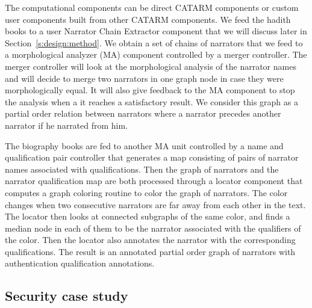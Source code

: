 \documentclass[12pt]{article}
\begin{document}
The computational components can be direct CATARM components
or custom user components built from other CATARM components.
We feed the hadith books to a user Narrator Chain Extractor
component that we will discuss later in 
Section~\ref{s:design:method}. We  obtain a set of chains
of narrators that we feed to a morphological analyzer (MA) 
component controlled by a merger controller. 
The merger controller will look at the morphological analysis
of the narrator names and will decide to merge two narrators in 
one graph node in case they were morphologically equal. 
It will also give feedback to the MA component to stop the
analysis when a it reaches a satisfactory result.
We consider this graph as a partial order relation between 
narrators where a narrator precedes another narrator if 
he narrated from him. 

The biography books are fed to another MA unit controlled by 
a name and qualification pair controller that generates a 
map consisting of pairs of narrator names associated with 
qualifications. 
Then the graph of narrators and the narrator qualification map
are both processed through a locator component that computes
a graph coloring routine to color the graph of narrators. 
The color changes when two consecutive narrators are far away
from each other in the text. 
The locator then looks at connected subgraphs of the same color,
and finds a median node in each of them to be the narrator 
associated with the qualifiers of the color. 
Then the locator also annotates the narrator with the 
corresponding qualifications. 
The result is an annotated partial order graph of narrators
with authentication qualification annotations. 

\subsection{Security case study}
\label{s:design:sec}

\begin{figure}
\end{figure}
\end{document}
